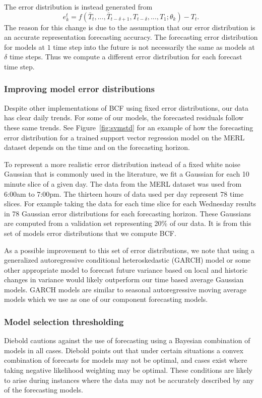 The error distribution is instead generated from 
\begin{equation}
e^{t}_{k} = f(\bar{T}_{t}, ..., \bar{T}_{t - \delta + 1}, T_{t - \delta}, ..., T_{1};\theta_{k}) - T_{t}.
\end{equation}
The reason for this change is due to the assumption that our error distribution is an accurate representation forecasting accuracy.  
The forecasting error distribution for models at $1$ time step into the future is not necessarily the same as models at $\delta$ time steps.  Thus we compute a different error distribution for each forecast time step.


\subsubsection{Improving model error distributions}
Despite other implementations of BCF using fixed error distributions, our data has clear daily trends.  For some of our models, the forecasted residuals follow these same trends.  See Figure~\ref{fig:svmstd} for an example of how the forecasting error distribution for a trained support vector regression model on the MERL dataset depends on the time and on the forecasting horizon.

To represent a more realistic error distribution instead of a fixed white noise Gaussian that is commonly used in the literature, we fit a Gaussian for each 10 minute slice of a given day.  The data from the MERL dataset was used from 6:00am to 7:00pm. The thirteen hours of data used per day represent 78 time slices.  For example taking the data for each time slice for each Wednesday results in 78 Gaussian error distributions for each forecasting horizon.  These Gaussians are computed from a validation set representing 20\% of our data.  It is from this set of models error distributions that we compute BCF.

As a possible improvement to this set of error distributions, we note that using a generalized autoregressive conditional heteroskedastic (GARCH) model \cite{Box2008} or some other appropriate model to forecast future variance based on local and historic changes in variance would likely outperform our time based average Gaussian models.  GARCH models are similar to seasonal autoregressive moving average models which we use as one of our component forecasting models.

\subsubsection{Model selection thresholding}
Diebold \cite{Diebold1991} cautions against the use of forecasting using a Bayesian combination of models in all cases.  Diebold points out that under certain situations a convex combination of forecasts for models may not be optimal, and cases exist where taking negative likelihood weighting may be optimal.  These conditions are likely to arise during instances where the data may not be accurately described by any of the forecasting models.  

